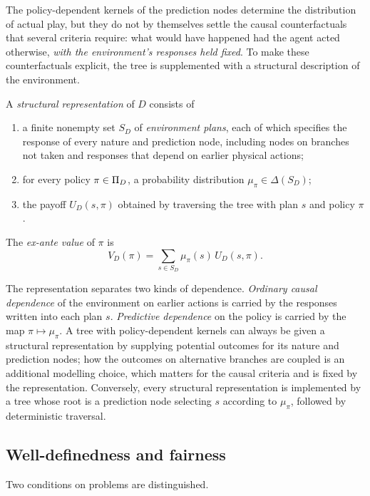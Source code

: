 The policy-dependent kernels of the prediction nodes determine the distribution of actual play,
but they do not by themselves settle the causal counterfactuals that several criteria require:
what would have happened had the agent acted otherwise, \emph{with the environment's responses
held fixed}. To make these counterfactuals explicit, the tree is supplemented with a structural
description of the environment.

\begin{definition}\label{def:structural}
A \emph{structural representation} of $D$ consists of
\begin{enumerate}[label=(\roman*)]
  \item a finite nonempty set $S_D$ of \emph{environment plans}, each of which specifies the response
        of every nature and prediction node, including nodes on branches not taken and responses that
        depend on earlier physical actions;
  \item for every policy $\pi\in\Pi_D$, a probability distribution $\mu_\pi\in\Delta(S_D)$;
  \item the payoff $U_D(s,\pi)$ obtained by traversing the tree with plan $s$ and policy $\pi$.
\end{enumerate}
The \emph{ex-ante value} of $\pi$ is
\[
  V_D(\pi)=\sum_{s\in S_D}\mu_\pi(s)\,U_D(s,\pi).
\]
\end{definition}

The representation separates two kinds of dependence. \emph{Ordinary causal dependence} of the
environment on earlier actions is carried by the responses written into each plan $s$.
\emph{Predictive dependence} on the policy is carried by the map $\pi\mapsto\mu_\pi$. A tree with
policy-dependent kernels can always be given a structural representation by supplying potential
outcomes for its nature and prediction nodes; how the outcomes on alternative branches are coupled
is an additional modelling choice, which matters for the causal criteria and is fixed by the
representation. Conversely, every structural representation is implemented by a tree whose root
is a prediction node selecting $s$ according to $\mu_\pi$, followed by deterministic traversal.

\subsection{Well-definedness and fairness}

Two conditions on problems are distinguished.

